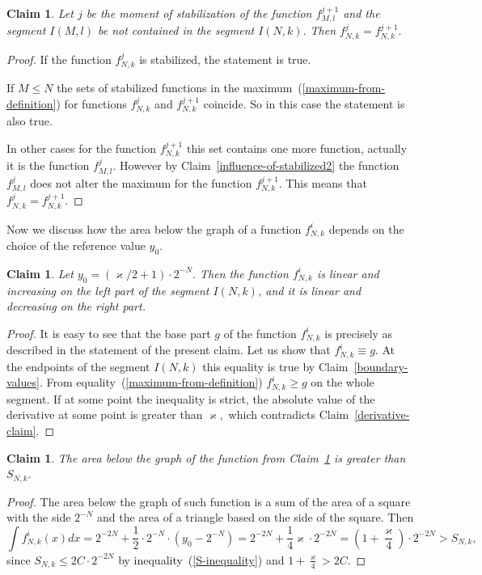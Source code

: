 \documentclass[12pt]{article}
\newtheorem{clai}[prop]{Claim}
\theoremstyle{definition}
\begin{document}
\begin{clai}
\label{influence-of-stabilized}
Let $j$ be the moment of stabilization of the function $f_{M,l}^{j+1}$ and the segment $I(M,l)$ be not contained in the segment $I(N,k).$
Then $f_{N, k}^{j}=f_{N, k}^{j+1}.$
\end{clai}
\begin{proof}
If the function $f_{N, k}^{j}$ is stabilized, the statement is true.

If $M\le N$ the sets of stabilized functions in the maximum~(\ref{maximum-from-definition}) for functions $f_{N, k}^{j}$ and $f_{N, k}^{j+1}$ coincide. So in this case the statement is also true.

In other cases for the function $f_{N, k}^{j+1}$ this set contains one more function, actually it is the function $f_{M,l}^{j}.$ However by Claim~\ref{influence-of-stabilized2} the function $f_{M,l}^{j}$ does not alter the maximum for the function $f_{N, k}^{j+1}$. This means that $f_{N, k}^{j}=f_{N, k}^{j+1}.$
\end{proof}

Now we discuss how the area below the graph of a function $f_{N,k}^i$ depends on the choice of the reference value $y_0.$

\begin{clai}
\label{maximal-y0-claim}
Let $y_0 = (\varkappa/2 +1)\cdot 2^{-N}.$ Then the function $f_{N,k}^i$ is linear and increasing on the left part of the segment $I(N,k)$, and it is linear and decreasing on the right part.
\end{clai}

\begin{proof}
It is easy to see that the base part $g$ of the function $f_{N,k}^i$ is precisely as described in the statement of the present claim. Let us show that $f_{N,k}^i \equiv g.$ At the endpoints of the segment $I(N,k)$ this equality is true by Claim~\ref{boundary-values}. From equality~(\ref{maximum-from-definition}) $f_{N,k}^i \ge g$ on the whole segment. If at some point the inequality is strict, the absolute value of the derivative at some point is greater than $\varkappa,$ which contradicts Claim~\ref{derivative-claim}.
\end{proof}

\begin{clai}
\label{maximal-y0-integral}
The area below the graph of the function from Claim~\ref{maximal-y0-claim} is greater than $S_{N,k}.$
\end{clai}

\begin{proof}
The area below the graph of such function is a sum of the area of a square with the side $2^{-N}$ and the area of a triangle based on the side of the square. Then
$$
\int f_{N,k}^i(x)dx = 2^{-2N} + \frac12\cdot 2^{-N}\cdot (y_0 - 2^{-N}) = 2^{-2N} + \frac14\varkappa\cdot 2^{-2N} =\left(1 + \frac{\varkappa}4\right)\cdot 2^{-2N}> S_{N,k},
$$
since $S_{N, k} \le 2C\cdot 2^{-2N}$ by inequality~(\ref{S-inequality}) and $1 + \frac{\varkappa}4 > 2C$.
\end{proof}
\end{document}
